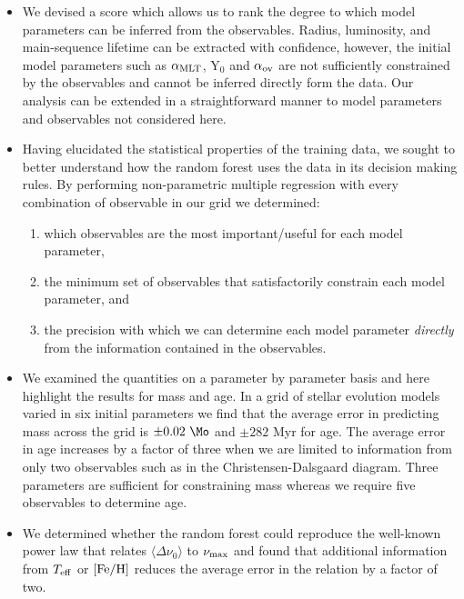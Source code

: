 \begin{itemize}
  \item We devised a score  which  allows us to rank the degree to which model parameters can be inferred from the observables.  Radius, luminosity, and main-sequence lifetime can be extracted  with confidence, however, the initial model parameters such as $\alpha_{\rm{MLT}}$, Y$_0$ and $\alpha_{\rm{ov}}$ are not sufficiently constrained by the observables and cannot be inferred directly form the data.  Our analysis can be extended in a straightforward manner to model parameters and observables not considered here.  
  
  
  \item Having elucidated the statistical properties of the training data, we sought to better understand how the random forest uses the data in its decision making rules.
By performing non-parametric multiple regression with every combination of observable in our grid we determined:
\begin{enumerate}
    \item  which observables are the most important/useful for each model parameter,
    \item  the minimum set of observables that satisfactorily constrain each model parameter, and
    \item  the precision with which we can determine each model parameter \emph{directly} from the information contained in the observables. 
\end{enumerate}



\item We examined the quantities on a parameter by parameter basis and here highlight the results for mass and age.  In a grid of stellar evolution models varied in six initial parameters we find that the average error in predicting mass across the grid is $\pm 0.02 \ \Mo$ and  $\pm 282$ Myr for age. The average error in age increases by a factor of three when we are limited to information from only two observables such as in the Christensen-Dalsgaard diagram. Three parameters are sufficient for constraining mass whereas we require five observables to determine age.  


\item We determined whether the random forest could reproduce the well-known power law that relates $\langle\Delta\nu_0\rangle$ to $\nu_{\rm{max}}$ and found that additional information from  $T_{\rm{eff}}$ or  $[\rm{Fe/H}]$ reduces the average error in the relation by a factor of two. 


\end{itemize}
